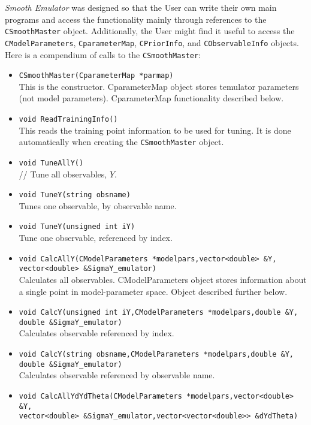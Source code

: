 \documentclass[UserManual.tex]{subfiles}
\begin{document}
{\it Smooth Emulator} was designed so that the User can write their own main programs and access the functionality mainly through references to the {\tt CSmoothMaster} object. Additionally, the User might find it useful to access the {\tt CModelParameters}, {\tt CparameterMap}, {\tt CPriorInfo}, and {\tt CObservableInfo} objects. Here is a compendium of calls to the {\tt CSmoothMaster}:
\begin{itemize}\itemsep=0pt
\item {\tt CSmoothMaster(CparameterMap *parmap)}\\
This is the constructor. CparameterMap object stores temulator parameters (not model parameters). CparameterMap functionality described below.
\item {\tt void ReadTrainingInfo()}\\
This reads the training point information to be used for tuning. It is done automatically when creating the {\tt CSmoothMaster} object.
\item {\tt void TuneAllY()}\\ //
Tune all observables, $Y$.
\item {\tt void TuneY(string obsname)}\\
Tunes one observable, by observable name.
\item {\tt void TuneY(unsigned int iY)}\\
Tune one observable, referenced by index.
\item {\tt void CalcAllY(CModelParameters *modelpars,vector<double> \&Y,\\vector<double> \&SigmaY\_emulator)}\\
Calculates all observables. CModelParameters object stores information about a single point in model-parameter space. Object described further below.
\item {\tt void CalcY(unsigned int iY,CModelParameters *modelpars,double \&Y,\\double \&SigmaY\_emulator)}\\
Calculates observable referenced by index.
\item {\tt void CalcY(string obsname,CModelParameters *modelpars,double \&Y,\\double \&SigmaY\_emulator)}\\
Calculates observable referenced by observable name.
\item {\tt void CalcAllYdYdTheta(CModelParameters *modelpars,vector<double> \&Y,\\
vector<double> \&SigmaY\_emulator,vector<vector<double>> \&dYdTheta)}\\

\end{itemize}
\end{document}
